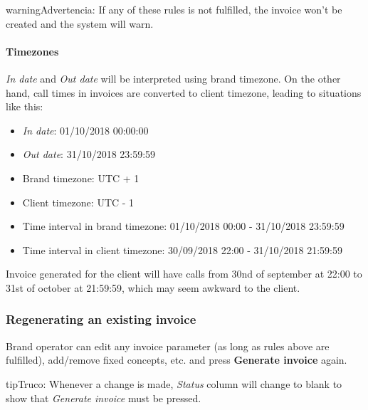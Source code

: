 \documentclass[letterpaper,10pt,spanish]{sphinxmanual}
\begin{document}
\begin{notice}{warning}{Advertencia:}
If any of these rules is not fulfilled, the invoice won't be created and the system will warn.
\end{notice}


\paragraph{Timezones}
\label{administration_portal/brand/invoicing/invoices:timezones}
\emph{In date} and \emph{Out date} will be interpreted using brand timezone. On the other hand, call times in invoices are converted
to client timezone, leading to situations like this:
\begin{itemize}
\item {} 
\emph{In date}: 01/10/2018 00:00:00

\item {} 
\emph{Out date}: 31/10/2018 23:59:59

\item {} 
Brand timezone: UTC + 1

\item {} 
Client timezone: UTC - 1

\item {} 
Time interval in brand timezone: 01/10/2018 00:00 - 31/10/2018 23:59:59

\item {} 
Time interval in client timezone: 30/09/2018 22:00 - 31/10/2018 21:59:59

\end{itemize}

Invoice generated for the client will have calls from 30nd of september at 22:00 to 31st of october at 21:59:59, which
may seem awkward to the client.


\subsubsection{Regenerating an existing invoice}
\label{administration_portal/brand/invoicing/invoices:regenerating-an-existing-invoice}
Brand operator can edit any invoice parameter (as long as rules above are fulfilled), add/remove fixed concepts, etc. and
press \textbf{Generate invoice} again.

\begin{notice}{tip}{Truco:}
Whenever a change is made, \emph{Status} column will change to blank to show that \emph{Generate invoice} must be pressed.
\end{notice}
\end{document}
